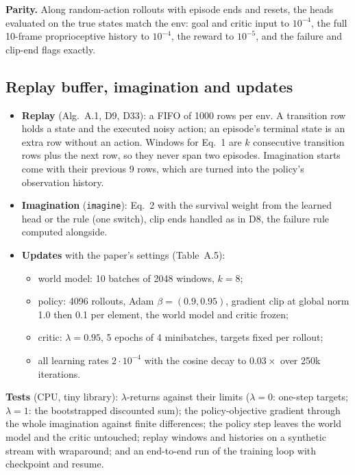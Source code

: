 \documentclass[10pt]{article}
\begin{document}
\textbf{Parity.} Along random-action rollouts with episode ends and resets, the heads evaluated on the
true states match the env: goal and critic input to $10^{-4}$, the full 10-frame proprioceptive
history to $10^{-4}$, the reward to $10^{-5}$, and the failure and clip-end flags exactly.

\subsection{Replay buffer, imagination and updates}

\begin{itemize}
  \item \textbf{Replay} (Alg.~A.1, D9, D33): a FIFO of 1000 rows per env. A transition row holds a
  state and the executed noisy action; an episode's terminal state is an extra row without an action.
  Windows for Eq.~1 are $k$ consecutive transition rows plus the next row, so they never span two
  episodes. Imagination starts come with their previous 9 rows, which are turned into the policy's
  observation history.
  \item \textbf{Imagination} (\texttt{imagine}): Eq.~2 with the survival weight from the learned head
  or the rule (one switch), clip ends handled as in D8, the failure rule computed alongside.
  \item \textbf{Updates} with the paper's settings (Table~A.5):
  \begin{itemize}
    \item world model: 10 batches of 2048 windows, $k = 8$;
    \item policy: 4096 rollouts, Adam $\beta = (0.9, 0.95)$, gradient clip at global norm 1.0 then
    0.1 per element, the world model and critic frozen;
    \item critic: $\lambda = 0.95$, 5 epochs of 4 minibatches, targets fixed per rollout;
    \item all learning rates $2\cdot10^{-4}$ with the cosine decay to $0.03\times$ over 250k
    iterations.
  \end{itemize}
\end{itemize}

\textbf{Tests} (CPU, tiny library): $\lambda$-returns against their limits ($\lambda = 0$: one-step
targets; $\lambda = 1$: the bootstrapped discounted sum); the policy-objective gradient through the
whole imagination against finite differences; the policy step leaves the world model and the critic
untouched; replay windows and histories on a synthetic stream with wraparound; and an end-to-end run
of the training loop with checkpoint and resume.
\end{document}
